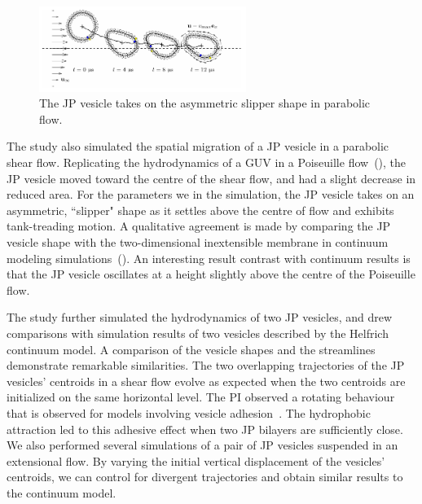 \begin{figure}
\includegraphics[width=0.6\textwidth]{figures/PreliminaryWork/Slipper.pdf}
\caption{The JP vesicle takes on the asymmetric slipper shape in parabolic flow.}
\end{figure}
The study also simulated the spatial migration of a JP vesicle in a
parabolic shear flow. 
%
Replicating the hydrodynamics of a GUV in a Poiseuille
flow~(\cite{Kaoui09, dan_vla_mis2009, cou_kao_pod_mis2008}), the JP
vesicle moved toward the centre of the shear flow,
and had a slight decrease in reduced area.
For the parameters we in the simulation,
the JP vesicle takes on an asymmetric, ``slipper" shape as it settles
above the centre of flow and exhibits tank-treading motion.
A qualitative
agreement is made by comparing the JP vesicle shape with the
two-dimensional inextensible membrane in continuum modeling
simulations~(\cite{Kaoui09, dan_vla_mis2009, cou_kao_pod_mis2008}). 
An interesting result contrast with continuum results is that the JP
vesicle oscillates at a height slightly above the centre of the
Poiseuille flow. 


The study further simulated the hydrodynamics of two JP vesicles, and
drew comparisons with simulation results of two vesicles described by
the Helfrich continuum model. A comparison of the vesicle shapes and the
streamlines demonstrate remarkable similarities. The two overlapping
trajectories of the JP vesicles' centroids in a shear flow evolve as
expected when the two centroids are initialized on the same horizontal
level. The PI observed a rotating behaviour that is observed for models
involving vesicle adhesion~\cite{qua-vee-you2019}.  The hydrophobic
attraction led to this adhesive effect when two JP bilayers are
sufficiently close. We also performed several simulations of a pair of
JP vesicles suspended in an extensional flow. By varying the initial
vertical displacement of the vesicles' centroids, we can control for
divergent trajectories and obtain similar results to the continuum
model.


